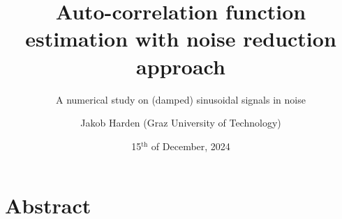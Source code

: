 \documentclass[11pt,aspectratio=169]{beamer}
\def\PresTitle{Auto-correlation function estimation with noise reduction approach}
\def\PresSubTitle{A numerical study on (damped) sinusoidal signals in noise}
\def\PresDate{15${}^{\text{th}}$ of December, 2024}
\def\PresAuthorFirstname{Jakob}
\def\PresAuthorLastname{Harden}
\def\PresAuthor{\PresAuthorFirstname{} \PresAuthorLastname{}}
\def\PresAuthorAffiliation{Graz University of Technology}
\begin{document}
	\author{\PresAuthor{} (\PresAuthorAffiliation{})}
	\title{\PresTitle{}}
	\subtitle{\PresSubTitle{}}
	\date{\PresDate{}}
	\begin{frame}[plain]
		\maketitle
	\end{frame}
	\section*{Abstract}
\end{document}
